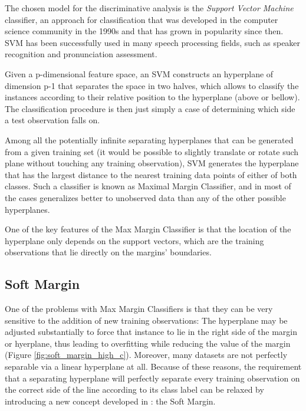 
The chosen model for the discriminative analysis is the \textit{Support Vector Machine} classifier,
an approach for classification that was developed in the computer science community in the 1990s
and that has grown in popularity since then. SVM has been successfully used in many
speech processing fields, such as speaker recognition and pronunciation assessment.

Given a p-dimensional feature space, an SVM constructs an hyperplane of dimension p-1
that separates the space in two halves, which allows to classify the instances according
to their relative position to the hyperplane (above or bellow). The classification
procedure is then just simply a case of determining which side a test observation falls on.

Among all the potentially infinite separating hyperplanes that can be generated from a
given training set (it would be possible to slightly translate or rotate such plane without
touching any training observation), SVM generates the hyperplane that has the largest
distance to the nearest training data points of either of both classes. Such a classifier
is known as Maximal Margin Classifier, and in most of the cases generalizes better to
unobserved data than any of the other possible hyperplanes.

One of the key features of the Max Margin Classifier is that the location of the hyperplane
only depends on the support vectors, which are the training observations that lie directly
on the margins' boundaries.

\subsection{Soft Margin}

One of the problems with Max Margin Classifiers is that they can be very sensitive to the
addition of new training observations: The hyperplane may be adjusted substantially
to force that instance to lie in the right side of the margin or hyerplane, thus leading
to overfitting while reducing the value of the margin (Figure \ref{fig:soft_margin_high_c}).
Moreover, many datasets are not perfectly separable via a linear hyperplane at all.
Because of these reasons, the requirement that a separating hyperplane will perfectly separate
every training observation on the correct side of the line according to its class label can
be relaxed by introducing a new concept developed in \cite{svm_soft_margin}: the Soft Margin.

